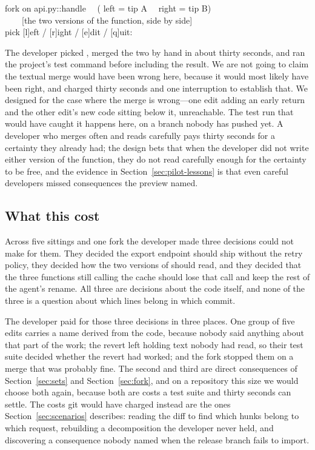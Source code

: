 \begin{out}
\ttrule{} fork on api.py::handle \ttrule{}~~(\ttleft{} left = tip A~~\ttright{} right = tip B)\\
~~~~[the two versions of the function, side by side]\\
pick [l]eft / [r]ight / [e]dit / [q]uit:
\end{out}

\noindent
The developer picked , merged the two by hand in about thirty seconds, and
\sgt{} ran the project's test command before including the result. We are not going to
claim the textual merge would have been wrong here, because it would most likely have
been right, and \sgt{} charged thirty seconds and one interruption to establish that.
We designed for the case where the merge is wrong---one edit adding an early return
and the other edit's new code sitting below it, unreachable. The test run that
would have caught it happens here, on a branch nobody has pushed yet. A developer who merges often and reads
carefully pays thirty seconds for a certainty they already had; the design bets that
when the developer did not write either version of the function, they do not read
carefully enough for the certainty to be free, and the evidence in
Section~\ref{sec:pilot-lessons} is that even careful developers missed consequences the
preview named.

\subsection{What this cost}

Across five sittings and one fork the developer made three decisions \sgt{} could
not make for them. They decided the export endpoint should ship without the retry
policy, they decided how the two versions of  should read, and
they decided that the three functions still calling the cache should lose that
call and keep the rest of the agent's rename. All three are decisions about the
code itself, and none of the three is a question about which lines belong in which
commit.

The developer paid for those three decisions in three places. One group of five edits
carries a name derived from the code, because nobody said anything about that part of
the work; the revert left  holding text nobody had read, so their
test suite decided whether the revert had worked; and the fork stopped them on a merge
that was probably fine. The second and third are direct consequences of
Section~\ref{sec:sets} and Section~\ref{sec:fork}, and on a repository this size we
would choose both again, because both are costs a test suite and thirty seconds can
settle. The costs git would have charged instead are the ones
Section~\ref{sec:scenarios} describes: reading the diff to find which hunks belong to
which request, rebuilding a decomposition the developer never held, and discovering a
consequence nobody named when the release branch fails to import.
